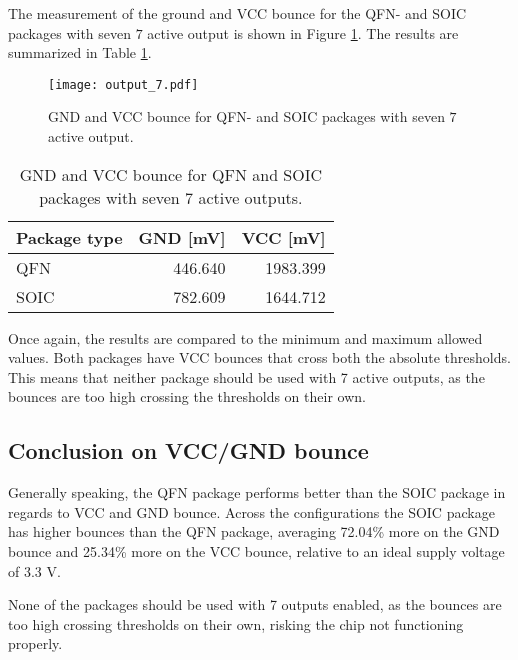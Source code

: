 \documentclass[../main.tex]{subfiles}
\begin{document}
\solution

The measurement of the ground and VCC bounce for the QFN- and SOIC packages with seven \(\textit{7}\) active output is shown in Figure \ref{fig:gnd_vcc_output_7}. The results are summarized in Table \ref{tab:output_7}.

\begin{figure}[H]
    \centering
    \texttt{[image: output\_7.pdf]}
    \caption{GND and VCC bounce for QFN- and SOIC packages with seven \(\textit{7}\) active output.}
    \label{fig:gnd_vcc_output_7}
\end{figure}
\begin{table}[H]
    \centering
    \begin{tabular}{l | r r}
        \toprule[1pt]
        Package type    & GND [mV]  & VCC [mV]\\
        \midrule
        QFN             & 446.640   & 1983.399  \\
        SOIC            & 782.609   & 1644.712  \\
        \bottomrule[1pt]
    \end{tabular}
    \caption{GND and VCC bounce for QFN and SOIC packages with seven \(\textit{7}\) active outputs.}
    \label{tab:output_7}
\end{table}

Once again, the results are compared to the minimum and maximum allowed values. Both packages have VCC bounces that cross both the absolute thresholds. This means that neither package should be used with 7 active outputs, as the bounces are too high crossing the thresholds on their own.

\vspace{10pt}


\subsection{Conclusion on VCC/GND bounce}

\solution

Generally speaking, the QFN package performs better than the SOIC package in regards to VCC and GND bounce. Across the configurations the SOIC package has higher bounces than the QFN package, averaging 72.04\% more on the GND bounce and 25.34\% more on the VCC bounce, relative to an ideal supply voltage of 3.3 V. 

None of the packages should be used with 7 outputs enabled, as the bounces are too high crossing thresholds on their own, risking the chip not functioning properly. 
\end{document}

